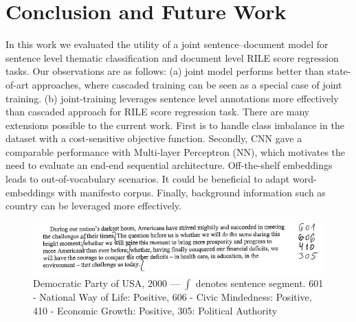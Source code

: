 \documentclass[11pt,a4paper]{article}
\begin{document}
\section{Conclusion and Future Work}
In this work we evaluated the utility of a joint sentence--document model for sentence level thematic classification and document level RILE score regression tasks. Our observations are as follows: (a) joint model performs better than state-of-art approaches, where cascaded training can be seen as a special case of joint training. (b) joint-training leverages sentence level annotations more effectively than cascaded approach for RILE score regression task. There are many extensions possible to the current work. First is to handle class imbalance in the dataset with a cost-sensitive objective function. Secondly, CNN gave a comparable performance with Multi-layer Perceptron (NN), which motivates the need to evaluate an end-end sequential architecture. Off-the-shelf embeddings leads to out-of-vocabulary scenarios. It could be beneficial to  adapt word-embeddings with manifesto corpus. Finally, background information such as country can be leveraged more effectively.


\begin{figure}
\includegraphics[width=1\linewidth]{US_Democrats_1.png}
\caption{Democratic Party of USA, 2000 --- $\int$ denotes sentence segment. 601 - National Way of Life: Positive, 606 - Civic Mindedness: Positive, 410 - Economic Growth: Positive, 305: Political Authority}
\label{fig:sub2}
\end{figure}

\end{document}
